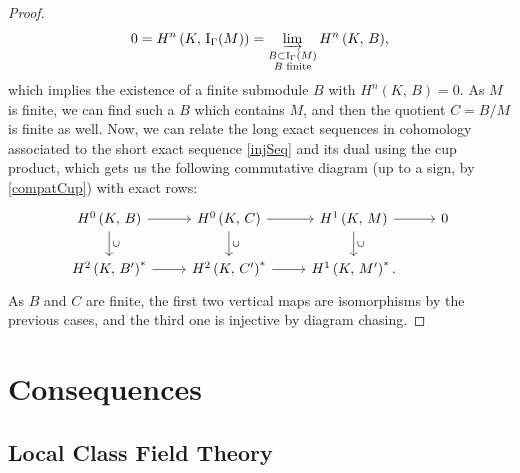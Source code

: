 \documentclass[a4paper]{article}
\def\K{K}
\renewcommand{\H}[3]{H^{#1}\left( #2, \, #3 \right)}
\newcommand{\Ind}[2]{\mathrm{I}_{#1}(#2)}
\theoremstyle{definition}
\theoremstyle{definition}
\theoremstyle{remark}
\begin{document}
\begin{proof}
    \[
        0=\H{n}{\K}{\Ind{\Gamma}{M}}=\varinjlim_{\substack{B\subset\Ind{\Gamma}{M} \\B\text{ finite}}}{\H{n}{\K}{B}},
    \]
    which implies the existence of a finite submodule \(B\) with \(\H{n}{\K}{B}=0\). As \(M\) is finite, we can find such a \(B\) which contains \(M\), and then
    the quotient \(C=B/M\) is finite as well.
    Now, we can relate the long exact sequences in cohomology associated to the short exact sequence \eqref{injSeq}
    and its dual using the cup product, which gets us the following commutative diagram (up to a sign, by \eqref{compatCup}) with exact rows:
    \[
        \begin{tikzcd}
            \H{0}{\K}{B} \ar[r] \ar[d, "\cup"] & \H{0}{\K}{C} \ar[r] \ar[d, "\cup"] & \H{1}{\K}{M} \ar[d, "\cup"] \ar[r] & 0 \\
            \H{2}{\K}{B^\prime}^* \ar[r] & \H{2}{\K}{C^\prime}^* \ar[r] & \H{1}{\K}{M^\prime}^*.
        \end{tikzcd}
    \]
    As \(B\) and \(C\) are finite, the first two vertical maps are isomorphisms by the previous cases, and the third one is injective by diagram chasing.

\end{proof}


\section{Consequences}

\subsection{Local Class Field Theory}


\nocite{*}
\printbibliography
\end{document}
